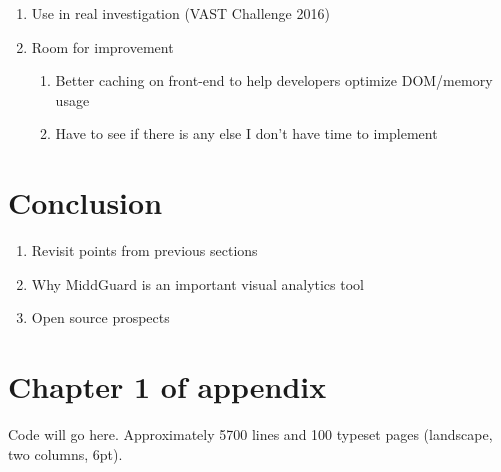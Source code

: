 \documentclass[midd]{thesis}
\begin{document}
\begin{enumerate}
  \item Use in real investigation (VAST Challenge 2016)
  \item Room for improvement
  \begin{enumerate}
    \item Better caching on front-end to help developers optimize DOM/memory
    usage
    \item Have to see if there is any else I don't have time to implement
  \end{enumerate}
\end{enumerate}

\chapter{Conclusion}
  \begin{enumerate}
    \item Revisit points from previous sections
    \item Why MiddGuard is an important visual analytics tool
    \item Open source prospects
  \end{enumerate}

\appendix
\chapter{Chapter 1 of appendix}

Code will go here. Approximately 5700 lines and 100 typeset pages (landscape,
two columns, 6pt).


\end{document}
